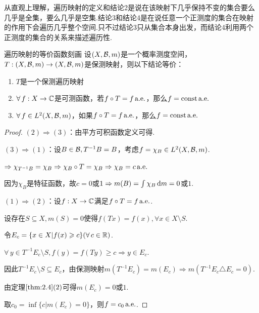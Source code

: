 从直观上理解，遍历映射的定义和结论2是说在该映射下几乎保持不变的集合要么几乎是全集，要么几乎是空集.结论3和结论4是在说任意一个正测度的集合在映射的作用下会遍历几乎整个空间.只不过结论3只从集合本身出发，而结论4利用两个正测度的集合的关系来描述遍历性.


\begin{theorem}{遍历映射的等价函数刻画}
    \wideline
    设$(X,\mathcal{B},m)$是一个概率测度空间，$T:(X,\mathcal{B},m)\to(X,\mathcal{B},m)$是保测映射，则以下结论等价：
    \begin{enumerate}[(1)]
        \item $T$是一个保测遍历映射
        \item $\forall\, f:X\to\mathbb{C}$是可测函数，若$f\circ T=f\operatorname{\text{a.e.}}$，那么$f=\mathrm{const}\operatorname{\text{a.e.}}$
        \item $\forall\, f\in L^2(X,\mathcal{B},m)$，如果$f\circ T=f\operatorname{\text{a.e.}}$，那么$f=\mathrm{const}\operatorname{\text{a.e.}}$
    \end{enumerate}
\end{theorem}
\begin{proof}
    $(2)\Rightarrow(3)$：由平方可积函数定义可得.\par
    $(3)\Rightarrow(1)$：设$B\in\mathcal{B},T^{-1}B=B$，考虑$f=\chi_B\in L^2(X,\mathcal{B},m)$.\par
    $\Rightarrow \chi_{T^{-1}B}=\chi_B \Rightarrow \chi_{B}\circ T=\chi_B \Rightarrow \chi_B=c \operatorname{\text{a.e.}}$\par
    因为$\chi_B$是特征函数，故$c=0$或$1\Rightarrow m(B)=\int\chi_B\mathop{}\!\mathrm{d} m=0$或$1$.\par
    $(1)\Rightarrow (2)$：设$f:X\to\mathbb{C}$满足$f\circ T=f\operatorname{\text{a.e.}}$.\par
    设存在$S\subseteq X,m(S)=0$使得$f(Tx)=f(x),\forall x\in X\setminus S$.\par
    令$E_c=\{x\in X|f(x)\geqslant c\}(\forall\, c\in\mathbb{R})$.\par
    $\forall\, y\in T^{-1}E_c\setminus S,f(y)=f(Ty)\geq c\Rightarrow y\in E_c$.\par
    因此$T^{-1}E_c\setminus S\subseteq E_c$，由保测映射$m(T^{-1}E_c)=m(E_c)\Rightarrow m(T^{-1}E_c\triangle E_c=0)$.\par
    由定理$\ref{thm:2.4}(2)$可得$m(E_c)=0$或$1$.\par
    取$c_0=\inf\{c|m(E_c)=0\}$，则$f=c_0 \operatorname{\text{a.e.}}$.
\end{proof}

